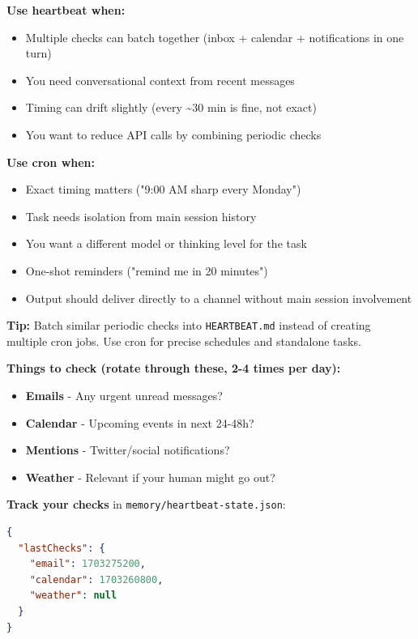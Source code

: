 \textbf{Use heartbeat when:}

\begin{itemize}
  \item Multiple checks can batch together (inbox + calendar + notifications in one turn)
  \item You need conversational context from recent messages
  \item Timing can drift slightly (every \textasciitilde{}30 min is fine, not exact)
  \item You want to reduce API calls by combining periodic checks
\end{itemize}


\textbf{Use cron when:}

\begin{itemize}
  \item Exact timing matters ("9:00 AM sharp every Monday")
  \item Task needs isolation from main session history
  \item You want a different model or thinking level for the task
  \item One-shot reminders ("remind me in 20 minutes")
  \item Output should deliver directly to a channel without main session involvement
\end{itemize}


\textbf{Tip:} Batch similar periodic checks into \texttt{HEARTBEAT.md} instead of creating multiple cron jobs. Use cron for precise schedules and standalone tasks.

\textbf{Things to check (rotate through these, 2-4 times per day):}

\begin{itemize}
  \item \textbf{Emails} - Any urgent unread messages?
  \item \textbf{Calendar} - Upcoming events in next 24-48h?
  \item \textbf{Mentions} - Twitter/social notifications?
  \item \textbf{Weather} - Relevant if your human might go out?
\end{itemize}


\textbf{Track your checks} in \texttt{memory/heartbeat-state.json}:

\begin{lstlisting}[language=json]
{
  "lastChecks": {
    "email": 1703275200,
    "calendar": 1703260800,
    "weather": null
  }
}
\end{lstlisting}


